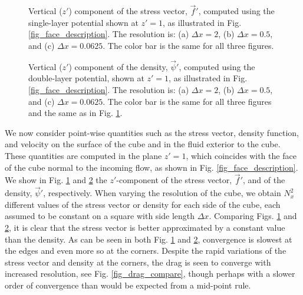 \begin{figure}[ht]
	\begin{center}
	\end{center}
	\caption{Vertical ($z'$) component of the stress vector, $\vec{f}'$, computed using the single-layer potential shown at $z'=1$, as illustrated in Fig. \ref{fig_face_description}. The resolution is: (a) $\Delta x = 2$, (b) $\Delta x = 0.5$, and (c) $\Delta x =  0.0625$. The color bar is the same for all three figures.  }
	\label{fig_stress_cube8_32}
\end{figure}


\begin{figure}[ht]
	\begin{center}
	\end{center}
	\caption{Vertical ($z'$) component of the density, $\vec{\psi}'$, computed using the double-layer potential, shown at $z'=1$, as illustrated in Fig. \ref{fig_face_description}. The resolution is: (a) $\Delta x = 2$, (b) $\Delta x = 0.5$, and (c) $\Delta x =  0.0625$. The color bar is the same for all three figures and the same as in Fig. \ref{fig_stress_cube8_32}.}
	\label{fig_density_cube8_32}
\end{figure}
\par
We now consider point-wise quantities such as the stress vector, density function, and velocity on the surface of the cube and in the fluid exterior to the cube. 
These quantities are computed in the plane $z'=1$, which coincides with the face of the cube normal to the incoming flow, as shown in Fig. \ref{fig_face_description}. 
We show in Fig. \ref{fig_stress_cube8_32} and \ref{fig_density_cube8_32} the $z'$-component of the stress vector, $\vec{f}'$, and of the density, $\vec{\psi}'$, 
respectively. 
When varying the resolution of the cube,  we obtain $N_x^2$ different values of the stress vector or density for each side of the cube, each assumed to be constant on a square with side length $\Delta x$.
Comparing Figs. \ref{fig_stress_cube8_32} and \ref{fig_density_cube8_32}, it is clear that the stress vector is better approximated by a constant value than the density.
 As can be seen in both Fig. \ref{fig_stress_cube8_32} and \ref{fig_density_cube8_32}, convergence is slowest at the edges and even more so at the corners. Despite the rapid variations of the stress vector and density at the corners, the drag is seen to converge with increased resolution, see Fig. \ref{fig_drag_compare}, though perhaps with a slower order of convergence than would be expected from a mid-point rule.
